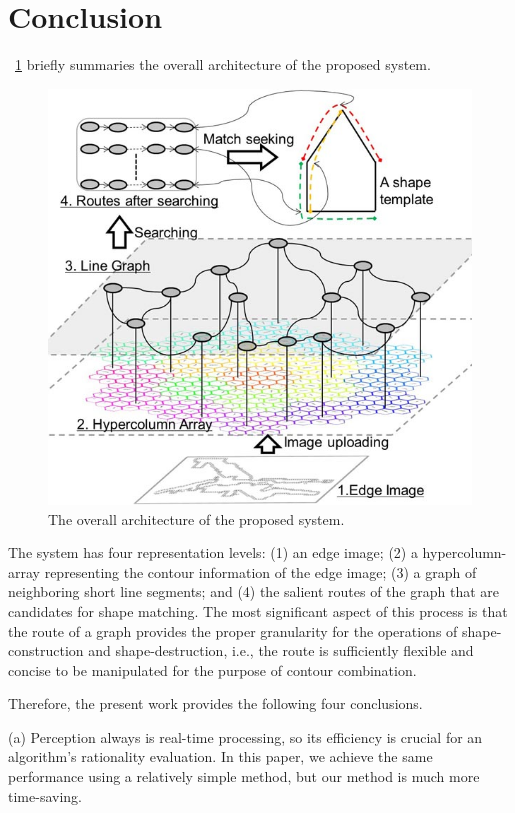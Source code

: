 \documentclass[journal]{IEEEtran}
\begin{document}
\section{Conclusion}

\figurename~\ref{fig:24} briefly summaries the overall architecture of the proposed system.

\begin{figure}[!t]
\centering
\includegraphics[width=0.95\linewidth]{images/fig24.jpg}
\caption{The overall architecture of the proposed system.}
\label{fig:24}
\end{figure}

The system has four representation levels: 
(1) an edge image; (2) a hypercolumn-array representing the contour information of the edge image; 
(3) a graph of neighboring short line segments; 
and (4) the salient routes of the graph that are candidates for shape matching. 
The most significant aspect of this process is that the route of a graph provides the proper granularity for the operations of shape-construction and shape-destruction, i.e., the route is sufficiently flexible and concise to be manipulated for the purpose of contour combination.

Therefore, the present work provides the following four conclusions.

(a) Perception always is real-time processing, so its efficiency is crucial for an algorithm's rationality evaluation. In this paper, we achieve the same performance using a relatively simple method, but our method is much more time-saving.
\end{document}
